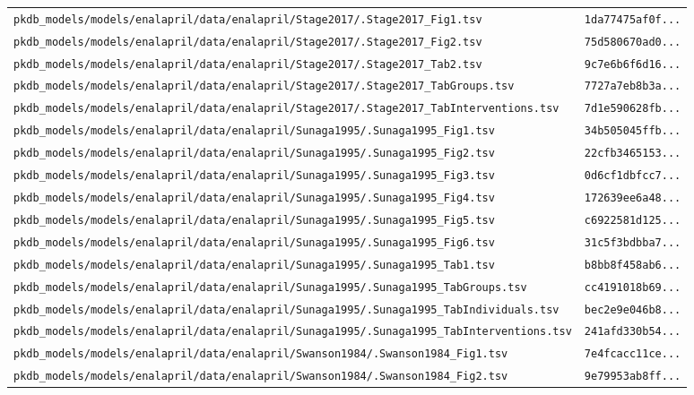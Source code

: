 \begin{longtable}{ll}
\texttt{pkdb\_models/models/enalapril/data/enalapril/Stage2017/.Stage2017\_Fig1.tsv} & \texttt{1da77475af0f...} \\
\texttt{pkdb\_models/models/enalapril/data/enalapril/Stage2017/.Stage2017\_Fig2.tsv} & \texttt{75d580670ad0...} \\
\texttt{pkdb\_models/models/enalapril/data/enalapril/Stage2017/.Stage2017\_Tab2.tsv} & \texttt{9c7e6b6f6d16...} \\
\texttt{pkdb\_models/models/enalapril/data/enalapril/Stage2017/.Stage2017\_TabGroups.tsv} & \texttt{7727a7eb8b3a...} \\
\texttt{pkdb\_models/models/enalapril/data/enalapril/Stage2017/.Stage2017\_TabInterventions.tsv} & \texttt{7d1e590628fb...} \\
\texttt{pkdb\_models/models/enalapril/data/enalapril/Sunaga1995/.Sunaga1995\_Fig1.tsv} & \texttt{34b505045ffb...} \\
\texttt{pkdb\_models/models/enalapril/data/enalapril/Sunaga1995/.Sunaga1995\_Fig2.tsv} & \texttt{22cfb3465153...} \\
\texttt{pkdb\_models/models/enalapril/data/enalapril/Sunaga1995/.Sunaga1995\_Fig3.tsv} & \texttt{0d6cf1dbfcc7...} \\
\texttt{pkdb\_models/models/enalapril/data/enalapril/Sunaga1995/.Sunaga1995\_Fig4.tsv} & \texttt{172639ee6a48...} \\
\texttt{pkdb\_models/models/enalapril/data/enalapril/Sunaga1995/.Sunaga1995\_Fig5.tsv} & \texttt{c6922581d125...} \\
\texttt{pkdb\_models/models/enalapril/data/enalapril/Sunaga1995/.Sunaga1995\_Fig6.tsv} & \texttt{31c5f3bdbba7...} \\
\texttt{pkdb\_models/models/enalapril/data/enalapril/Sunaga1995/.Sunaga1995\_Tab1.tsv} & \texttt{b8bb8f458ab6...} \\
\texttt{pkdb\_models/models/enalapril/data/enalapril/Sunaga1995/.Sunaga1995\_TabGroups.tsv} & \texttt{cc4191018b69...} \\
\texttt{pkdb\_models/models/enalapril/data/enalapril/Sunaga1995/.Sunaga1995\_TabIndividuals.tsv} & \texttt{bec2e9e046b8...} \\
\texttt{pkdb\_models/models/enalapril/data/enalapril/Sunaga1995/.Sunaga1995\_TabInterventions.tsv} & \texttt{241afd330b54...} \\
\texttt{pkdb\_models/models/enalapril/data/enalapril/Swanson1984/.Swanson1984\_Fig1.tsv} & \texttt{7e4fcacc11ce...} \\
\texttt{pkdb\_models/models/enalapril/data/enalapril/Swanson1984/.Swanson1984\_Fig2.tsv} & \texttt{9e79953ab8ff...} \\

\end{longtable}
